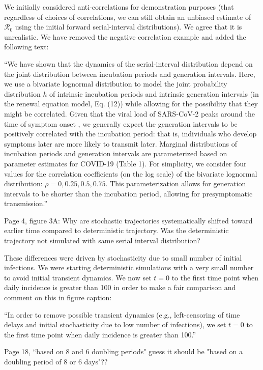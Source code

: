 \documentclass[12pt]{article}
\newcommand{\Ro}{\ensuremath{{\mathcal R}_{0}}\xspace}
\newcommand{\revtext}{\textsf}
\begin{document}
We initially considered anti-correlations for demonstration purposes (that regardless of choices of correlations, we can still obtain an unbiased estimate of \Ro using the initial forward serial-interval distributions). We agree that it is unrealistic. We have removed the negative correlation example and added the following text:

``We have shown that the dynamics of the serial-interval distribution depend on the joint distribution between incubation periods and generation intervals.
Here, we use a bivariate lognormal distribution to model the joint probability distribution $h$ of intrinsic incubation periods and intrinsic generation intervals (in the renewal equation model, Eq. (12)) while allowing for the possibility that they might be correlated.
Given that the viral load of SARS-CoV-2 peaks around the time of symptom onset \citep{he2020temporal}, we generally expect the generation intervals to be positively correlated with the incubation period:
that is, individuals who develop symptoms later are more likely to transmit later.
Marginal distributions of incubation periods and generation intervals are parameterized based on parameter estimates for COVID-19 (Table 1).
For simplicity, we consider four values for the correlation coefficients (on the log scale) of the bivariate lognormal distribution: $\rho = 0, 0.25, 0.5, 0.75$.
This parameterization allows for generation intervals to be shorter than the incubation period, allowing for presymptomatic transmission.''

\revtext{Page 4, figure 3A: Why are stochastic trajectories systematically shifted toward earlier time compared to deterministic trajectory. Was the deterministic trajectory not simulated with same serial interval distribution?}

These differences were driven by stochasticity due to small number of initial infections. We were starting deterministic simulations with a very small number to avoid initial transient dynamics.
We now set $t=0$ to the first time point when daily incidence is greater than 100 in order to make a fair comparison and comment on this in figure caption:

``In order to remove possible transient dynamics (e.g., left-censoring of time delays and initial stochasticity due to low number of infections), we set $t=0$ to the first time point when daily incidence is greater than 100.''

\revtext{Page 18, ``based on 8 and 6 doubling periods" guess it should be "based on a doubling period of 8 or 6 days"??}
\end{document}
